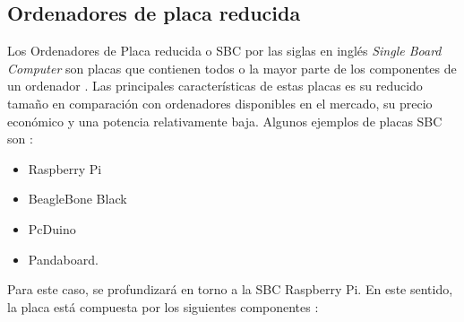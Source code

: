 \subsection{Ordenadores de placa reducida}

Los Ordenadores de Placa reducida o SBC por las siglas en inglés \textit{Single Board Computer} son placas que contienen todos o la mayor parte de los componentes de un ordenador \citep{garcia2014}. Las principales características de estas placas es su reducido tamaño en comparación con ordenadores disponibles en el mercado, su precio económico y una potencia relativamente baja. Algunos ejemplos de placas SBC son \citep{garcia2014}:
\begin{itemize}
\item Raspberry Pi
\item BeagleBone Black
\item PcDuino
\item Pandaboard.
\end{itemize}

Para este caso, se profundizará en torno a la SBC Raspberry Pi. En este sentido, la placa está compuesta por los siguientes componentes \citep{gareth2018}:

